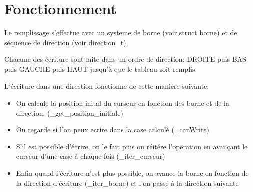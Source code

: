 \documentclass[a4paper]{article}
\begin{document}
\section{Fonctionnement}

Le remplissage s'effectue avec un systeme de borne (voir struct borne) et de séquence de direction (voir direction\_t).

Chacune des écriture sont faite dans un ordre de direction: DROITE puis BAS puis GAUCHE puis HAUT jusqu'à que le tableau soit remplis.

L'écriture dans une direction fonctionne de cette manière suivante:
\begin{itemize}
  \item On calcule la position inital du curseur en fonction des borne et de la direction. (\_get\_position\_initiale)
  \item On regarde si l'on peux ecrire dans la case calculé (\_canWrite)
  \item S'il est possible d'écrire, on le fait puis on réitére l'operation en avançant le curseur d'une case à chaque fois (\_iter\_curseur) 
  \item Enfin quand l'écriture n'est plus possible, on avance la borne en fonction de la direction d'écriture (\_iter\_borne) et l'on passe à la direction suivante
\end{itemize}


\end{document}
